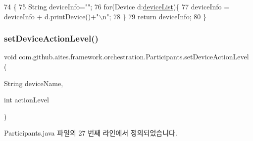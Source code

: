 \begin{DoxyCode}
74                                          \{
75         String deviceInfo=\textcolor{stringliteral}{""};
76         \textcolor{keywordflow}{for}(Device d:\mbox{\hyperlink{classcom_1_1github_1_1aites_1_1framework_1_1orchestration_1_1_participants_ab90ca1b5cf16aec6e3e6608df4a8d2ad}{deviceList}})\{
77             deviceInfo = deviceInfo + d.printDevice()+\textcolor{stringliteral}{"\(\backslash\)n"};
78         \}
79         \textcolor{keywordflow}{return} deviceInfo;
80     \}
\end{DoxyCode}
\mbox{\label{classcom_1_1github_1_1aites_1_1framework_1_1orchestration_1_1_participants_a01e1793359d254af92377896fcb9be1d}} 
\subsubsection{\texorpdfstring{set\+Device\+Action\+Level()}{setDeviceActionLevel()}}
{\footnotesize\ttfamily void com.\+github.\+aites.\+framework.\+orchestration.\+Participants.\+set\+Device\+Action\+Level (\begin{DoxyParamCaption}\item[{String}]{device\+Name,  }\item[{int}]{action\+Level }\end{DoxyParamCaption})}



Participants.\+java 파일의 27 번째 라인에서 정의되었습니다.


